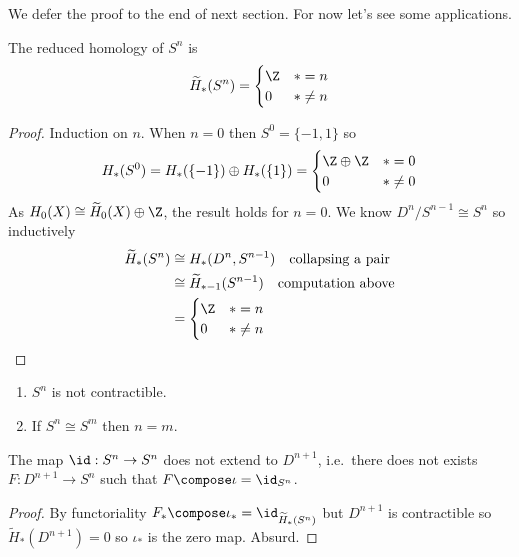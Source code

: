\documentclass[a4paper]{article}
\begin{document}
We defer the proof to the end of next section. For now let's see some applications.

\begin{proposition}
  The reduced homology of \(S^n\) is
  \begin{align*}
    \widetilde H_*(S^n) =
    \begin{cases}
      \Z & * = n \\
      0 & * \neq n
    \end{cases}
  \end{align*}
\end{proposition}

\begin{proof}
  Induction on \(n\). When \(n = 0\) then \(S^0 = \{-1, 1\}\) so
  \[
    H_*(S^0) = H_*(\{-1\}) \oplus H_*(\{1\}) =
    \begin{cases}
      \Z \oplus \Z & * = 0 \\
      0 & * \neq 0
    \end{cases}
  \]
  As \(H_0(X) \cong \widetilde H_0(X) \oplus \Z\), the result holds for \(n = 0\). We know \(D^n/S^{n - 1} \cong S^n\) so inductively
  \begin{align*}
    \widetilde H_*(S^n)
    &\cong H_*(D^n, S^{n - 1}) \quad \text{collapsing a pair} \\
    &\cong \widetilde H_{* - 1}(S^{n - 1}) \quad \text{computation above} \\
    &=
      \begin{cases}
        \Z & * = n \\
        0 & * \neq n
      \end{cases}
  \end{align*}
\end{proof}

\begin{corollary}\leavevmode
  \begin{enumerate}
  \item \(S^n\) is not contractible.
  \item If \(S^n \cong S^m\) then \(n = m\).
  \end{enumerate}
\end{corollary}

\begin{corollary}
  The map \(\id: S^n \to S^n\) does not extend to \(D^{n + 1}\), i.e.\ there does not exists \(F: D^{n + 1} \to S^n\) such that \(F \compose \iota = \id_{S^n}\).
\end{corollary}

\begin{proof}
  By functoriality \(F_* \compose \iota_* = \id_{\widetilde H_*(S^n)}\) but \(D^{n + 1}\) is contractible so \(\widetilde H_*(D^{n + 1}) = 0\) so \(\iota_*\) is the zero map. Absurd.
\end{proof}
\end{document}
